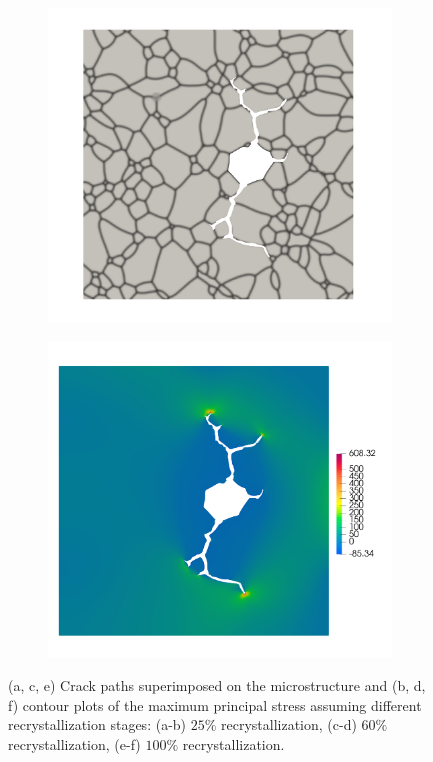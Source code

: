 \begin{figure}[htbp!]
  \begin{subfigure}[t]{0.35\linewidth}
    \centering
    \includegraphics[width=\linewidth]{Chapter3/figures/partial_hbs_3}
    \caption{}
  \end{subfigure}
  \begin{subfigure}[t]{0.35\linewidth}
    \centering
    \includegraphics[width=\linewidth]{Chapter3/figures/partial_hbs_3_stress}
    \caption{}
  \end{subfigure}
  \caption[Crack propagation at different recrystallization stages.]{ (a, c, e) Crack paths superimposed on the microstructure and (b, d, f) contour plots of the maximum principal stress assuming different recrystallization stages: (a-b) $25\%$ recrystallization, (c-d) $60\%$ recrystallization, (e-f) $100\%$ recrystallization. }
  \label{fig:partial_hbs}
\end{figure}
